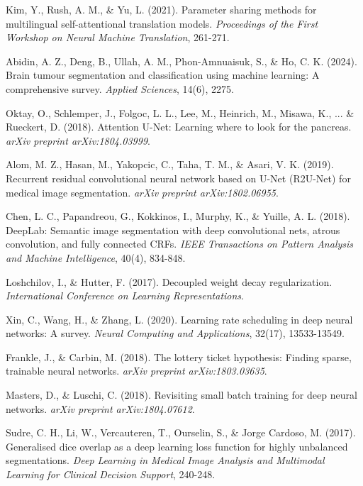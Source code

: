 \documentclass[12pt,a4paper]{article}
\begin{document}
\begin{enumerate}
\begin{thebibliography}{99}
Kim, Y., Rush, A. M., \& Yu, L. (2021). Parameter sharing methods for multilingual self-attentional translation models. \textit{Proceedings of the First Workshop on Neural Machine Translation}, 261-271.

Abidin, A. Z., Deng, B., Ullah, A. M., Phon-Amnuaisuk, S., \& Ho, C. K. (2024). Brain tumour segmentation and classification using machine learning: A comprehensive survey. \textit{Applied Sciences}, 14(6), 2275.

Oktay, O., Schlemper, J., Folgoc, L. L., Lee, M., Heinrich, M., Misawa, K., ... \& Rueckert, D. (2018). Attention U-Net: Learning where to look for the pancreas. \textit{arXiv preprint arXiv:1804.03999}.

Alom, M. Z., Hasan, M., Yakopcic, C., Taha, T. M., \& Asari, V. K. (2019). Recurrent residual convolutional neural network based on U-Net (R2U-Net) for medical image segmentation. \textit{arXiv preprint arXiv:1802.06955}.

Chen, L. C., Papandreou, G., Kokkinos, I., Murphy, K., \& Yuille, A. L. (2018). DeepLab: Semantic image segmentation with deep convolutional nets, atrous convolution, and fully connected CRFs. \textit{IEEE Transactions on Pattern Analysis and Machine Intelligence}, 40(4), 834-848.

Loshchilov, I., \& Hutter, F. (2017). Decoupled weight decay regularization. \textit{International Conference on Learning Representations}.

Xin, C., Wang, H., \& Zhang, L. (2020). Learning rate scheduling in deep neural networks: A survey. \textit{Neural Computing and Applications}, 32(17), 13533-13549.

Frankle, J., \& Carbin, M. (2018). The lottery ticket hypothesis: Finding sparse, trainable neural networks. \textit{arXiv preprint arXiv:1803.03635}.

Masters, D., \& Luschi, C. (2018). Revisiting small batch training for deep neural networks. \textit{arXiv preprint arXiv:1804.07612}.

Sudre, C. H., Li, W., Vercauteren, T., Ourselin, S., \& Jorge Cardoso, M. (2017). Generalised dice overlap as a deep learning loss function for highly unbalanced segmentations. \textit{Deep Learning in Medical Image Analysis and Multimodal Learning for Clinical Decision Support}, 240-248.


\end{thebibliography}
\end{enumerate}
\end{document}
